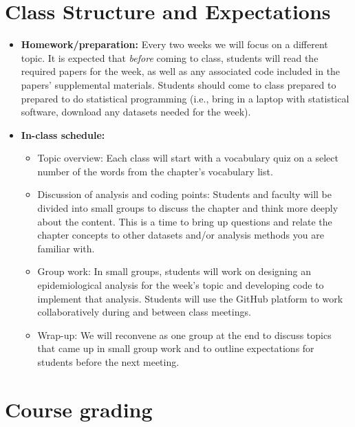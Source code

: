 \documentclass[
]{book}
\providecommand{\tightlist}{%
  \setlength{\itemsep}{0pt}\setlength{\parskip}{0pt}}
\begin{document}
\hypertarget{class-structure-and-expectations}{%
\section{Class Structure and Expectations}\label{class-structure-and-expectations}}

\begin{itemize}
\tightlist
\item
  \textbf{Homework/preparation:} Every two weeks we will focus on a different topic.
  It is expected that \emph{before} coming to class, students will read the required
  papers for the week, as well as any associated code included in the papers'
  supplemental materials. Students should come to class prepared to prepared to do
  statistical programming (i.e., bring in a laptop with statistical software,
  download any datasets needed for the week).
\item
  \textbf{In-class schedule:}

  \begin{itemize}
  \tightlist
  \item
    Topic overview: Each class will start with a vocabulary quiz on a select
    number of the words from the chapter's vocabulary list.
  \item
    Discussion of analysis and coding points: Students and faculty will be
    divided into small groups to discuss the chapter and think more deeply about
    the content. This is a time to bring up questions and relate the chapter
    concepts to other datasets and/or analysis methods you are familiar with.
  \item
    Group work: In small groups, students will work on designing an
    epidemiological analysis for the week's topic and developing code to
    implement that analysis. Students will use the GitHub platform to
    work collaboratively during and between class meetings.
  \item
    Wrap-up: We will reconvene as one group at the end to discuss topics that
    came up in small group work and to outline expectations for students before
    the next meeting.
  \end{itemize}
\end{itemize}

\hypertarget{course-grading}{%
\section{Course grading}\label{course-grading}}
\end{document}
